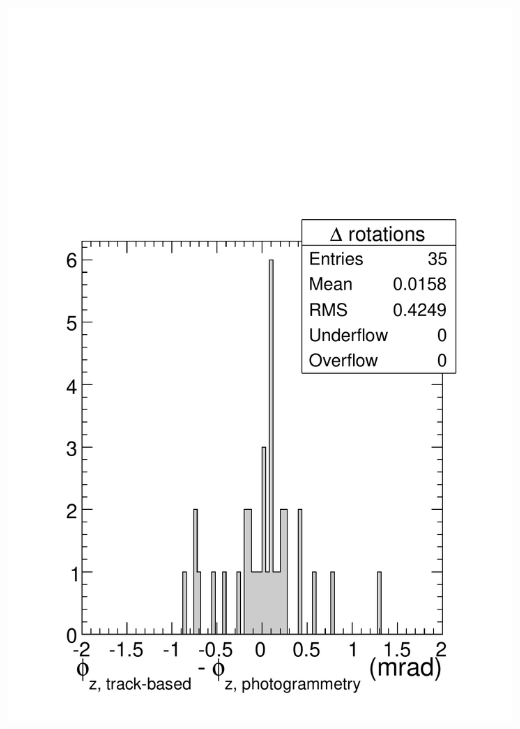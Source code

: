 \documentclass[compress]{beamer}
\begin{document}
\begin{frame}
\begin{columns}
\includegraphics[width=\linewidth]{delta_rotations.pdf}
\end{columns}
\end{frame}
\end{document}
